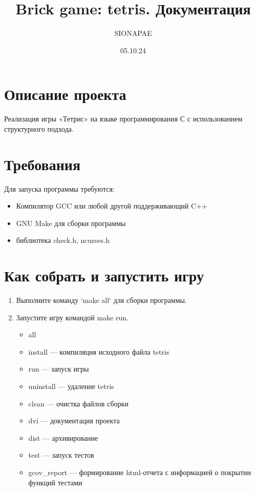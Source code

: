 \documentclass{article}
\title{\Large Brick game: tetris. Документация}
\author{SIONAPAE}
\date{05.10.24}
\begin{document}
\maketitle

\begin{figure}[h]
\end{figure}
\section{Описание проекта}
Реализация игры «Тетрис» на языке программирования С с использованием структурного подхода.

\section{Требования}
Для запуска программы требуются:
\begin{itemize}
    \item Компилятор GCC или любой другой поддерживающий C++
    \item GNU Make для сборки программы
    \item библиотека check.h, ncurses.h
\end{itemize}

\section{Как собрать и запустить игру}
\begin{enumerate}
    \item Выполните команду `make all` для сборки программы.
    \item Запустите игру командой make run.
    \begin{itemize}
        \item all  
        \item install — компиляция исходного файла tetris
        \item run — запуск игры 
        \item uninstall — удаление tetris 
        \item clean — очистка файлов сборки
        \item dvi — документация проекта
        \item dist — архивирование 
        \item test — запуск тестов 
        \item gcov\_report — формирование html-отчета с информацией о покрытии функций тестами
    \end{itemize}
\end{enumerate}
\end{document}
